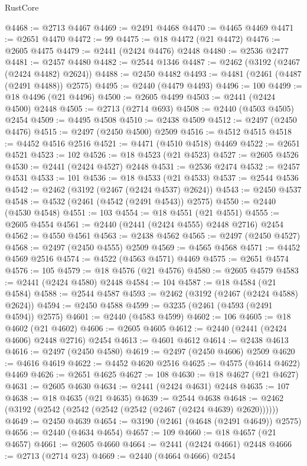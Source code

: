 \begin{lexlean}{RustCore}
\begin{coremodule}
@4468 := @2713 @4467
@4469 := @2491 @4468
@4470 := @4465 @4469
@4471 := @2651 @4470
@4472 := 99
@4475 := @18 @4472 (@21 @4472)
@4476 := @2605 @4475
@4479 := @2441 (@2424 @4476) @2448
@4480 := @2536 @2477
@4481 := @2457 @4480
@4482 := @2544 @1346
@4487 := @2462 (@3192 (@2467 (@2424 @4482) @2624))
@4488 := @2450 @4482
@4493 := @4481 (@2461 (@4487 (@2491 @4488)) @2575)
@4495 := @2440 (@4479 @4493)
@4496 := 100
@4499 := @18 @4496 (@21 @4496)
@4500 := @2605 @4499
@4503 := @2441 (@2424 @4500) @2448
@4505 := @2713 (@2714 @693)
@4508 := @2440 (@4503 @4505) @2454
@4509 := @4495 @4508
@4510 := @2438 @4509
@4512 := @2497 (@2450 @4476)
@4515 := @2497 (@2450 @4500) @2509
@4516 := @4512 @4515
@4518 := @4452 @4516 @2516
@4521 := @4471 (@4510 @4518) @4469
@4522 := @2651 @4521
@4523 := 102
@4526 := @18 @4523 (@21 @4523)
@4527 := @2605 @4526
@4530 := @2441 (@2424 @4527) @2448
@4531 := @2536 @2474
@4532 := @2457 @4531
@4533 := 101
@4536 := @18 @4533 (@21 @4533)
@4537 := @2544 @4536
@4542 := @2462 (@3192 (@2467 (@2424 @4537) @2624))
@4543 := @2450 @4537
@4548 := @4532 (@2461 (@4542 (@2491 @4543)) @2575)
@4550 := @2440 (@4530 @4548)
@4551 := 103
@4554 := @18 @4551 (@21 @4551)
@4555 := @2605 @4554
@4561 := @2440 (@2441 (@2424 @4555) @2448 @2716) @2454
@4562 := @4550 @4561
@4563 := @2438 @4562
@4565 := @2497 (@2450 @4527)
@4568 := @2497 (@2450 @4555) @2509
@4569 := @4565 @4568
@4571 := @4452 @4569 @2516
@4574 := @4522 (@4563 @4571) @4469
@4575 := @2651 @4574
@4576 := 105
@4579 := @18 @4576 (@21 @4576)
@4580 := @2605 @4579
@4583 := @2441 (@2424 @4580) @2448
@4584 := 104
@4587 := @18 @4584 (@21 @4584)
@4588 := @2544 @4587
@4593 := @2462 (@3192 (@2467 (@2424 @4588) @2624))
@4594 := @2450 @4588
@4599 := @3235 (@2461 (@4593 (@2491 @4594)) @2575)
@4601 := @2440 (@4583 @4599)
@4602 := 106
@4605 := @18 @4602 (@21 @4602)
@4606 := @2605 @4605
@4612 := @2440 (@2441 (@2424 @4606) @2448 @2716) @2454
@4613 := @4601 @4612
@4614 := @2438 @4613
@4616 := @2497 (@2450 @4580)
@4619 := @2497 (@2450 @4606) @2509
@4620 := @4616 @4619
@4622 := @4452 @4620 @2516
@4625 := @4575 (@4614 @4622) @4469
@4626 := @2651 @4625
@4627 := 108
@4630 := @18 @4627 (@21 @4627)
@4631 := @2605 @4630
@4634 := @2441 (@2424 @4631) @2448
@4635 := 107
@4638 := @18 @4635 (@21 @4635)
@4639 := @2544 @4638
@4648 := @2462 (@3192 (@2542 (@2542 (@2542 (@2542 (@2467 (@2424 @4639) @2620))))))
@4649 := @2450 @4639
@4654 := @3190 (@2461 (@4648 (@2491 @4649)) @2575)
@4656 := @2440 (@4634 @4654)
@4657 := 109
@4660 := @18 @4657 (@21 @4657)
@4661 := @2605 @4660
@4664 := @2441 (@2424 @4661) @2448
@4666 := @2713 (@2714 @23)
@4669 := @2440 (@4664 @4666) @2454

\end{coremodule}
\end{lexlean}
